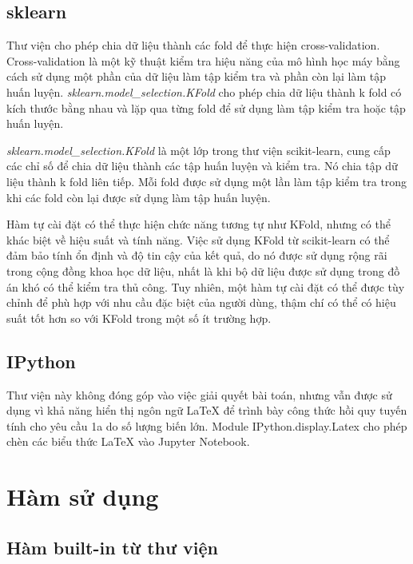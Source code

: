 \documentclass[]{article}
\begin{document}
\subsection{sklearn}
Thư viện cho phép chia dữ liệu thành các fold để thực hiện cross-validation. Cross-validation là một kỹ thuật kiểm tra hiệu năng của mô hình học máy bằng cách sử dụng một phần của dữ liệu làm tập kiểm tra và phần còn lại làm tập huấn luyện. \textit{sklearn.model\_selection.KFold} cho phép chia dữ liệu thành k fold có kích thước bằng nhau và lặp qua từng fold để sử dụng làm tập kiểm tra hoặc tập huấn luyện.

\textit{sklearn.model\_selection.KFold} là một lớp trong thư viện scikit-learn, cung cấp các chỉ số để chia dữ liệu thành các tập huấn luyện và kiểm tra. Nó chia tập dữ liệu thành k fold liên tiếp. Mỗi fold được sử dụng một lần làm tập kiểm tra trong khi các fold còn lại được sử dụng làm tập huấn luyện.

Hàm tự cài đặt có thể thực hiện chức năng tương tự như KFold, nhưng có thể khác biệt về hiệu suất và tính năng. Việc sử dụng KFold từ scikit-learn có thể đảm bảo tính ổn định và độ tin cậy của kết quả, do nó được sử dụng rộng rãi trong cộng đồng khoa học dữ liệu, nhất là khi bộ dữ liệu được sử dụng trong đồ án khó có thể kiểm tra thủ công. Tuy nhiên, một hàm tự cài đặt có thể được tùy chỉnh để phù hợp với nhu cầu đặc biệt của người dùng, thậm chí có thể có hiệu suất tốt hơn so với KFold trong một số ít trường hợp.

\subsection{IPython}
Thư viện này không đóng góp vào việc giải quyết bài toán, nhưng vẫn được sử dụng vì khả năng hiển thị ngôn ngữ LaTeX để trình bày công thức hồi quy tuyến tính cho yêu cầu 1a do số lượng biến lớn. Module IPython.display.Latex cho phép chèn các biểu thức LaTeX vào Jupyter Notebook.

\section{Hàm sử dụng}
\subsection{Hàm built-in từ thư viện}
\end{document}
